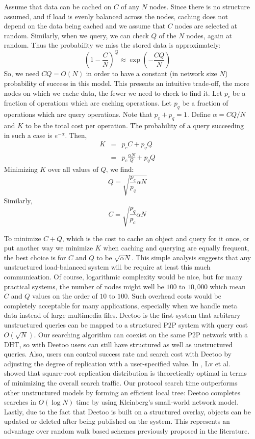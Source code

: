 \documentclass[9.5pt,journal,final,finalsubmission,twocolumn]{IEEEtran}
\begin{document}
Assume that data can be cached on $C$ of any $N$ nodes.
Since there is no structure assumed, and if load is evenly
balanced across the nodes,
caching does not depend on the data
being cached and we assume that $C$ nodes are selected at random.  Similarly,
when we query, we can check $Q$ of the $N$ nodes, again at random.  Thus the
probability we miss the stored data is approximately:
\[
\left(1-\frac{C}{N}\right)^Q \approx \exp(-\frac{CQ}{N})
\]
So, we need $CQ = O(N)$ in order to have a constant (in network size $N$)
probability of success in
this model.  This presents an intuitive trade-off, the more nodes on which we
cache data, the fewer we need to check to find it.  
Let $p_c$ be a fraction of operations which are caching operations.  Let $p_q$ be a fraction of operations which are query operations. 
Note that $p_c +p_q=1$. 
Define $\alpha = CQ/N$ and $K$ to be the total cost per operation.
The probability of a query succeeding in such a case is $e^{-\alpha}$.
Then, 
\begin{eqnarray}
K&=&p_cC+p_qQ \\
 &=&p_c\frac{\alpha N}{Q}+p_qQ
\end{eqnarray}
Minimizing $K$ over all values of $Q$, we find:
\begin{equation}\label{eq:c_cost}
Q = \sqrt{\frac{p_c}{p_q}\alpha N}
\end{equation} 
Similarly, 
\begin{equation}\label{eq:q_cost}
C = \sqrt{\frac{p_q}{p_c}\alpha N}
\end{equation}

To minimize $C+Q$, which
is the cost to cache an object and query for it once, or put
another way we minimize $K$ when caching and querying are equally frequent, the
best choice is for $C$ and $Q$ to be $\sqrt{\alpha N}$. 
This simple analysis
suggests that any unstructured load-balanced system will be require at least
this much communication.  Of course, logarithmic complexity would be nice, but
for many practical systems, the number of nodes might well be $100$ to
$10,000$ which mean $C$ and $Q$ values on the order of $10$ to $100$.
Such overhead costs would be completely acceptable for many applications,
 especially when we handle meta data instead of large multimedia files.
Deetoo is the first system that arbitrary unstructured queries can be mapped 
to a structured P2P system with query cost $O(\sqrt{N})$.
Our searching algorithm can coexist on the same P2P network
with a DHT, so with Deetoo
users can still have structured as well as unstructured queries.
Also, users can control success rate and search cost with Deetoo by 
adjusting the degree of replication with a user-specified value.
In \cite{LCKS02}, Lv et al. showed that
square-root replication distribution is theoretically optimal in
terms of minimizing the overall search traffic. 
Our protocol search time outperforms other unstructured models by forming 
an efficient local tree: 
Deetoo completes searches in  
$O(\log N)$ time by using Kleinberg's small-world network model.  
Lastly, due to the fact that Deetoo is built on a structured overlay,
objects can be updated or deleted after being published on the
system. This represents an advantage over random
walk based schemes previously proposed in the literature.
\end{document}
